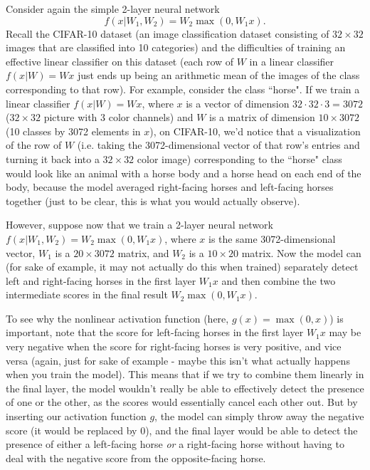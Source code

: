 Consider again the simple 2-layer neural network
$$f(x|W_1, W_2) = W_2\max\left(0, W_1x \right).$$
Recall the CIFAR-10 dataset (an image classification dataset consisting of $32 \times 32$ images that are classified into 10 categories) and the difficulties of training an effective linear classifier on this dataset (each row of $W$ in a linear classifier $f(x|W) = Wx$ just ends up being an arithmetic mean of the images of the class corresponding to that row). For example, consider the class ``horse". If we train a linear classifier $f(x|W) = Wx$, where $x$ is a vector of dimension $32 \cdot 32 \cdot 3 = 3072$ ($32\times 32$ picture with 3 color channels) and $W$ is a matrix of dimension $10 \times 3072$ (10 classes by 3072 elements in $x$), on CIFAR-10, we'd notice that a visualization of the row of $W$ (i.e. taking the 3072-dimensional vector of that row's entries and turning it back into a $32 \times 32$ color image) corresponding to the ``horse" class would look like an animal with a horse body and a horse head on each end of the body, because the model averaged right-facing horses and left-facing horses together (just to be clear, this is what you would actually observe).

However, suppose now that we train a 2-layer neural network $f(x|W_1, W_2) = W_2\max \left(0, W_1x\right)$, where $x$ is the same 3072-dimensional vector, $W_1$ is a $20 \times 3072$ matrix, and $W_2$ is a $10 \times 20$ matrix. Now the model can (for sake of example, it may not actually do this when trained) separately detect left and right-facing horses in the first layer $W_1x$ and then combine the two intermediate scores in the final result $W_2\max \left(0, W_1x\right)$.

To see why the nonlinear activation function (here, $g(x) = \max(0, x)$) is important, note that the score for left-facing horses in the first layer $W_1x$ may be very negative when the score for right-facing horses is very positive, and vice versa (again, just for sake of example - maybe this isn't what actually happens when you train the model). This means that if we try to combine them linearly in the final layer, the model wouldn't really be able to effectively detect the presence of one or the other, as the scores would essentially cancel each other out. But by inserting our activation function $g$, the model can simply throw away the negative score (it would be replaced by 0), and the final layer would be able to detect the presence of either a left-facing horse \emph{or} a right-facing horse without having to deal with the negative score from the opposite-facing horse.
